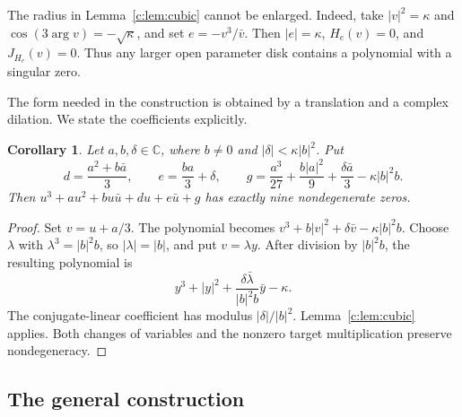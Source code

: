 \documentclass[UTF8,11pt]{ctexart}
\newtheorem{cor}[thm]{Corollary}
\theoremstyle{definition}
\numberwithin{equation}{section}
\newcommand{\C}{\mathbb C}\newcommand{\R}{\mathbb R}
\begin{document}
The radius in Lemma~\ref{c:lem:cubic} cannot be enlarged. Indeed, take
$|v|^2=\kappa$ and $\cos(3\arg v)=-\sqrt\kappa$, and set
$e=-v^3/\bar v$. Then $|e|=\kappa$, $H_e(v)=0$, and $J_{H_e}(v)=0$.
Thus any larger open parameter disk contains a polynomial with a
singular zero.

The form needed in the construction is obtained by a translation and
a complex dilation. We state the coefficients explicitly.
\begin{cor}\label{c:cor:local}
Let $a,b,\delta\in\C$, where $b\ne0$ and
$|\delta|<\kappa|b|^2$. Put
\begin{equation}\label{c:eq:localcoefficients}
 d=\frac{a^2+b\bar a}{3},\qquad
 e=\frac{ba}{3}+\delta,\qquad
 g=\frac{a^3}{27}+\frac{b|a|^2}{9}
       +\frac{\delta\bar a}{3}-\kappa|b|^2b.
\end{equation}
Then $u^3+au^2+bu\bar u+du+e\bar u+g$ has exactly nine
nondegenerate zeros.
\end{cor}
\begin{proof}
Set $v=u+a/3$. The polynomial becomes
$v^3+b|v|^2+\delta\bar v-\kappa|b|^2b$.
Choose $\lambda$ with $\lambda^3=|b|^2b$, so $|\lambda|=|b|$,
and put $v=\lambda y$. After division by $|b|^2b$, the resulting
polynomial is
\[
 y^3+|y|^2+\frac{\delta\bar\lambda}{|b|^2b}\bar y-\kappa.
\]
The conjugate-linear coefficient has modulus $|\delta|/|b|^2$.
Lemma~\ref{c:lem:cubic} applies. Both changes of variables and the
nonzero target multiplication preserve nondegeneracy.
\end{proof}

\subsection{The general construction}\label{c:sec:family}
\end{document}
